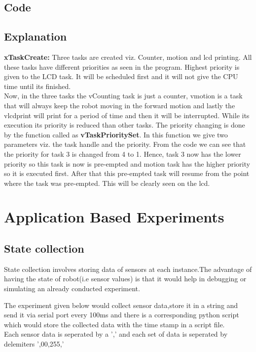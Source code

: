 \documentclass[11pt,a4paper]{book}
\begin{document}
	\subsection{Code}
	
	
	
	
	\newpage
	
	\subsection{Explanation}
	\textbf{xTaskCreate:} Three tasks are created viz. Counter, motion and lcd printing. All these tasks have different priorities as seen in the program. Highest priority is given to the LCD task. It will be scheduled first and it will not give the CPU time until its finished.\\
	Now, in the three tasks the vCounting task is just a counter, vmotion is a task that will always keep the robot moving in the forward motion and lastly the vlcdprint will print for a period of time and then it will be interrupted. While its execution its priority is reduced than other tasks. The priority changing is done by the function called as \textbf{vTaskPrioritySet}. In this function we give two parameters viz. the task handle and the priority. From the code we can see that the priority for task 3 is changed from 4 to 1. Hence, task 3 now has the lower priority so this task is now is pre-empted and motion task has the higher priority so it is executed first. After that this pre-empted task will resume from the point where the task was pre-empted. This will be clearly seen on the lcd.  
	
	\section{Application Based Experiments}
	\subsection{State collection}
	State collection involves storing data of sensors at each instance.The advantage of having the state of robot(i.e sensor values) is that it would help in debugging or simulating an already conducted experiment.
	
	The experiment given below would collect sensor data,store it in a string and send it via serial port every 100ms and there is a corresponding python script which would store the collected data with the time stamp in a script file.
	\\
	Each sensor data is seperated by a ',' and each set of data is seperated by delemiters ',00,255,'
\end{document}
